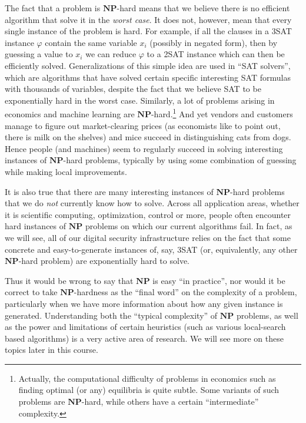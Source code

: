 The fact that a problem is \(\mathbf{NP}\)-hard means that we believe
there is no efficient algorithm that solve it in the \emph{worst case}.
It does not, however, mean that every single instance of the problem is
hard. For example, if all the clauses in a 3SAT instance \(\varphi\)
contain the same variable \(x_i\) (possibly in negated form), then by
guessing a value to \(x_i\) we can reduce \(\varphi\) to a 2SAT instance
which can then be efficiently solved. Generalizations of this simple
idea are used in ``SAT solvers'', which are algorithms that have solved
certain specific interesting SAT formulas with thousands of variables,
despite the fact that we believe SAT to be exponentially hard in the
worst case. Similarly, a lot of problems arising in economics and
machine learning are \(\mathbf{NP}\)-hard.\footnote{Actually, the
  computational difficulty of problems in economics such as finding
  optimal (or any) equilibria is quite subtle. Some variants of such
  problems are \(\mathbf{NP}\)-hard, while others have a certain
  ``intermediate'' complexity.} And yet vendors and customers manage to
figure out market-clearing prices (as economists like to point out,
there is milk on the shelves) and mice succeed in distinguishing cats
from dogs. Hence people (and machines) seem to regularly succeed in
solving interesting instances of \(\mathbf{NP}\)-hard problems,
typically by using some combination of guessing while making local
improvements.

It is also true that there are many interesting instances of
\(\mathbf{NP}\)-hard problems that we do \emph{not} currently know how
to solve. Across all application areas, whether it is scientific
computing, optimization, control or more, people often encounter hard
instances of \(\mathbf{NP}\) problems on which our current algorithms
fail. In fact, as we will see, all of our digital security
infrastructure relies on the fact that some concrete and
easy-to-generate instances of, say, 3SAT (or, equivalently, any other
\(\mathbf{NP}\)-hard problem) are exponentially hard to solve.

Thus it would be wrong to say that \(\mathbf{NP}\) is easy ``in
practice'', nor would it be correct to take \(\mathbf{NP}\)-hardness as
the ``final word'' on the complexity of a problem, particularly when we
have more information about how any given instance is generated.
Understanding both the ``typical complexity'' of \(\mathbf{NP}\)
problems, as well as the power and limitations of certain heuristics
(such as various local-search based algorithms) is a very active area of
research. We will see more on these topics later in this course.

